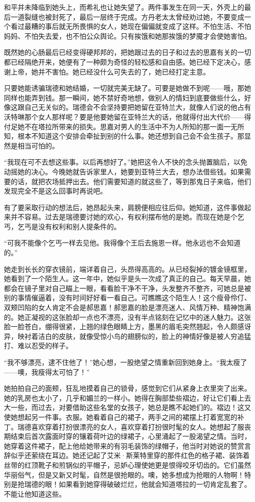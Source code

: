 \par 和平并未降临到她头上，而希礼也让她失望了。两件事发生在同一天，外壳上的最后一道裂缝也被封死了，最后一层终于完成。方丹老太太曾经劝过她，不要变成一个看过最糟的事后就无所畏惧的女人，她现在偏偏就变成了这样。不怕生活、不怕妈妈、不怕失去爱，也不怕公众舆论。只有挨饿和她那挨饿的梦魇才会使她害怕。
\par 既然她的心肠最后已经变得硬邦邦的，把她跟过去的日子和过去的思嘉有关的一切都已经隔绝开来，她便有了一种颇为奇怪的轻松感和自由感。她已经下定决心，感谢上帝，她并不害怕。她已经没什么可失去的了，她已经打定主意。
\par 只要她能诱骗瑞德和她结婚，一切就完美无缺了。可要是她做不到呢——哦，那她同样也能弄到钱。那一瞬间，她不禁好奇地想，做别人的情妇到底要做些什么，好像这跟自己无关似的。瑞德会不会坚持要把她留在亚特兰大，就像人们说的他占有沃特琳那个女人那样呢？要是他要她留在亚特兰大的话，他就得付出大代价——得付足她不在塔拉所带来的损失。思嘉对男人的生活中不为人所知的那一面一无所知，根本不知道这个安排会牵扯到别的什么事。她还想到自己会不会生孩子。那显然是相当可怕的。
\par “我现在可不去想这些事。以后再想好了。”她把这令人不快的念头抛置脑后，以免动摇她的决心。今晚她就告诉家里人，她要到亚特兰大去，想办法借些钱。如果需要的话，就把农场抵押出去。他们需要知道的就这些了，等到那鬼日子来临，他们发现完全不是这么回事时再说吧。
\par 有了要采取行动的想法后，她昂起头来，肩膀便相应往后仰。她知道，这件事做起来并不容易。过去是瑞德要讨她的欢心，有权利摆布他的是她。而现在她是个乞丐，乞丐是没有权利和别人提条件的。
\par “可我不能像个乞丐一样去见他。我得像个王后去施恩一样。他永远也不会知道的。”
\par 她走到长长的穿衣镜前，端详着自己，头昂得高高的。从已经裂掉的镀金镜框里，她看到了一个陌生人。这一年中，她似乎是头一次成了真正的自己。每天早晨，她都会在镜子里对自己瞄上一眼，看看脸干净不干净，头发整齐不整齐，可她总是被别的事情催逼着，没有时间好好看一看自己。可瞧瞧这个陌生人！这个瘦骨伶仃、双颊凹陷的女人肯定不会是郝思嘉！郝思嘉的脸是漂亮迷人、风情万种、精神饱满的。她正凝视的这张脸却一点也不漂亮，没有半点铭刻在记忆中的迷人魅力。这张脸一脸苍白，绷得很紧，上翘的绿色眼睛上方，墨黑的眉毛突然翘起，令人颇感讶异，映衬着洁白的皮肤，就像受惊小鸟的翅膀似的，脸上的神情好像是被人穷追猛打、难以忍受的样子。
\par “我不够漂亮，逮不住他了！”她心想，一股绝望之情重新回到她身上。“我太瘦了——噢，我瘦得太可怕了！”
\par 她拍拍自己的面颊，狂乱地摸着自己的锁骨，感觉到它们从紧身上衣里突了出来。她的乳房也太小了，几乎和媚兰的一样小。她得在胸部垫些褶边，好让它们看上去大一些，而过去，对要借助这些名堂的女孩子，她总是瞧不起她们的。褶边！这又使她想起另一件事。衣服。她看着自己的裙子，两手之间的裙摆上打着宽宽的补丁。瑞德喜欢穿着打扮很漂亮的女人，喜欢穿着打扮很时髦的女人。她想起了服丧期结束后首次露面时穿的镶着荷叶边的绿裙子，心里涌起了一股渴望之情。当时，她穿着这件裙子，配上他给她带来的有羽毛装饰的绿帽子，他当时对她说的赞赏言辞似乎还萦绕在耳边。她还记起了艾米·斯莱特里穿的那件红色的格子裙、装饰着丝带的红顶靴子和煎锅似的平帽子，忌妒心理使她更是恨得咬牙切齿的。它们虽然华丽俗气，但是又新又时髦，自然是很抢眼的。噢，她多想成为抢眼的人物啊！特别是抢瑞德的眼！如果看到她穿得破破烂烂，他就会知道塔拉的一切肯定乱套了。不能让他知道这些。
